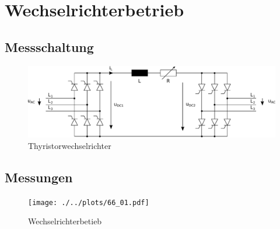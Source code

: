 \section{Wechselrichterbetrieb}

\subsection{Messschaltung}

\begin{figure}[h!]
    \centering
    \includegraphics[scale=\sscale]{./../fig/b6_thyristor_wr.pdf}
    \caption{Thyristorwechselrichter}
    \label{fig:b6_thyristor_wr}
\end{figure}

\subsection{Messungen}

\begin{figure}[h!]
    \centering
    \texttt{[image: ./../plots/66\_01.pdf]}
    \caption{Wechselrichterbetieb}
    \label{fig:b2_diode_l16}
\end{figure}

\clearpage
